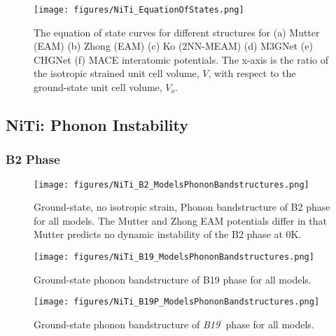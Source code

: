 \documentclass[preprint]{elsarticle}
\begin{document}
\begin{figure}[ht!]
    \begin{centering}
        \texttt{[image: figures/NiTi\_EquationOfStates.png]}
        \caption{
            The equation of state curves for different  structures for (a) Mutter (EAM) (b) Zhong (EAM) (c) Ko (2NN-MEAM) (d) M3GNet (e) CHGNet (f) MACE interatomic potentials. The x-axis is the ratio of the isotropic strained unit cell volume, $V$,  with respect to the ground-state unit cell volume, $V_o$.
        }
        \label{fig:eos}
    \end{centering}
\end{figure}

\subsection{NiTi: Phonon Instability}
\label{subsec:niphonons}


\subsubsection{B2 Phase}
\label{subsubsec:b2}

\begin{figure}[!htp]
    \begin{centering}
        \texttt{[image: figures/NiTi\_B2\_ModelsPhononBandstructures.png]}
        \caption{
          Ground-state, no isotropic strain, Phonon bandstructure of B2 phase for all models. The Mutter and Zhong EAM potentials differ in that Mutter predicts no dynamic instability of the B2 phase at 0K. 
        }
        \label{fig:allmodels_b2}
    \end{centering}
\end{figure}

\begin{figure}[!htp]
    \begin{centering}
        \texttt{[image: figures/NiTi\_B19\_ModelsPhononBandstructures.png]}
        \caption{
          Ground-state phonon bandstructure of B19 phase for all models.
        }
        \label{fig:allmodels_B19P}
    \end{centering}
\end{figure}

\begin{figure}[!htp]
    \begin{centering}
        \texttt{[image: figures/NiTi\_B19P\_ModelsPhononBandstructures.png]}
        \caption{
          Ground-state phonon bandstructure of \textit{B19}$^\prime$ phase for all models.
        }
        \label{fig:allmodels_B19P}
    \end{centering}
\end{figure}
\end{document}
